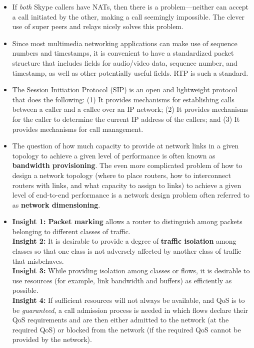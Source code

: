\begin{itemize}
\item
If \textit{both} Skype callers have NATs, then there is a problem---neither can accept a call initiated by the other, making a call seemingly impossible. The clever use of super peers and relays nicely solves this problem.

\item
Since most multimedia networking applications can make use of sequence numbers and timestamps, it is convenient to have a standardized packet structure that includes fields for audio/video data, sequence number, and timestamp, as well as other potentially useful fields. RTP is such a standard.

\item
The Session Initiation Protocol (SIP) is an open and lightweight protocol that does the following: (1) It provides mechanisms for establishing calls between a caller and a callee over an IP network; (2) It provides mechanisms for the caller to determine the current IP address of the callers; and (3) It provides mechanisms for call management.

\item
The question of how much capacity to provide at network links in a given topology to achieve a given level of performance is often known as \textbf{bandwidth provisioning}. The even more complicated problem of how to design a network topology (where to place routers, how to interconnect routers with links, and what capacity to assign to links) to achieve a given level of end-to-end performance is a network design problem often referred to as \textbf{network dimensioning}.

\item
\textbf{Insight 1: Packet marking} allows a router to distinguish among packets belonging to different classes of traffic.\\
\textbf{Insight 2:} It is desirable to provide a degree of \textbf{traffic isolation} among classes so that one class is not adversely affected by another class of traffic that misbehaves.\\
\textbf{Insight 3:} While providing isolation among classes or flows,  it is desirable to use resources (for example, link bandwidth and buffers) as efficiently as possible.\\
\textbf{Insight 4:} If sufficient resources will not always be available, and QoS is to be \textit{guaranteed}, a call admission process is needed in which flows declare their QoS requirements and are then either admitted to the network (at the required QoS) or blocked from the network (if the required QoS cannot be provided by the network).


\end{itemize}

